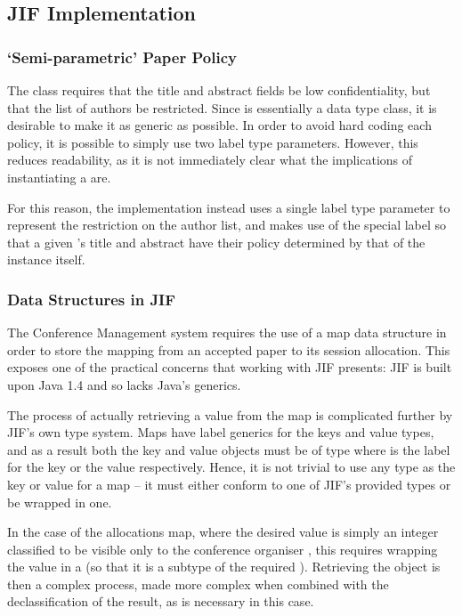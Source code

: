 \subsection{JIF Implementation}

\subsubsection{`Semi-parametric' Paper Policy}

The  class requires that the title and abstract fields be low confidentiality, but that the list of authors be restricted. Since  is essentially a data type class, it is desirable to make it as generic as possible. In order to avoid hard coding each policy, it is possible to simply use two label type parameters. However, this reduces readability, as it is not immediately clear what the implications of instantiating a  are.

For this reason, the implementation instead uses a single label type parameter to represent the restriction on the author list, and makes use of the special  label so that a given 's title and abstract have their policy determined by that of the instance itself.

\subsubsection{Data Structures in JIF}

The Conference Management system requires the use of a map data structure in order to store the mapping from an accepted paper to its session allocation. This exposes one of the practical concerns that working with JIF presents: JIF is built upon Java 1.4 and so lacks Java's generics.

The process of actually retrieving a value from the map is complicated further by JIF's own type system. Maps have label generics for the keys and value types, and as a result both the key and value objects must be of type  where  is the label for the key or the value respectively. Hence, it is not trivial to use any type as the key or value for a map -- it must either conform to one of JIF's provided types or be wrapped in one.

In the case of the allocations map, where the desired value is simply an integer classified to be visible only to the conference organiser , this requires wrapping the value in a  (so that it is a subtype of the required ). Retrieving the object is then a complex process, made more complex when combined with the declassification of the result, as is necessary in this case.

